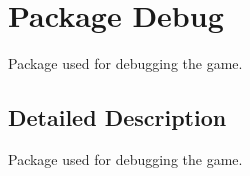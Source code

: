 \hypertarget{namespace_debug}{\section{Package Debug}
\label{namespace_debug}
}


Package used for debugging the game.  




\subsection{Detailed Description}
Package used for debugging the game. 